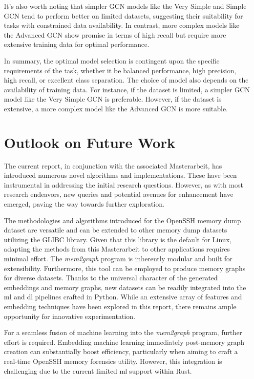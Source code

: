 It's also worth noting that simpler GCN models like the Very Simple and Simple GCN tend to perform better on limited datasets, suggesting their suitability for tasks with constrained data availability. In contrast, more complex models like the Advanced GCN show promise in terms of high recall but require more extensive training data for optimal performance.

In summary, the optimal model selection is contingent upon the specific requirements of the task, whether it be balanced performance, high precision, high recall, or excellent class separation. The choice of model also depends on the availability of training data. For instance, if the dataset is limited, a simpler GCN model like the Very Simple GCN is preferable. However, if the dataset is extensive, a more complex model like the Advanced GCN is more suitable. 

\section{Outlook on Future Work}\label{conclusion:sec:future_work}


The current report, in conjunction with the associated Masterarbeit, has introduced numerous novel algorithms and implementations. These have been instrumental in addressing the initial research questions. However, as with most research endeavors, new queries and potential avenues for enhancement have emerged, paving the way towards further exploration.

The methodologies and algorithms introduced for the OpenSSH memory dump dataset are versatile and can be extended to other memory dump datasets utilizing the GLIBC library. Given that this library is the default for Linux, adapting the methods from this Masterarbeit to other applications requires minimal effort. The \textit{mem2graph} program is inherently modular and built for extensibility. Furthermore, this tool can be employed to produce memory graphs for diverse datasets. Thanks to the universal character of the generated embeddings and memory graphs, new datasets can be readily integrated into the \acrshort{ml} and \acrshort{dl} pipelines crafted in Python. While an extensive array of features and embedding techniques have been explored in this report, there remains ample opportunity for innovative experimentation.

For a seamless fusion of machine learning into the \textit{mem2graph} program, further effort is required. Embedding machine learning immediately post-memory graph creation can substantially boost efficiency, particularly when aiming to craft a real-time OpenSSH memory forensics utility. However, this integration is challenging due to the current limited \acrshort{ml} support within Rust.

